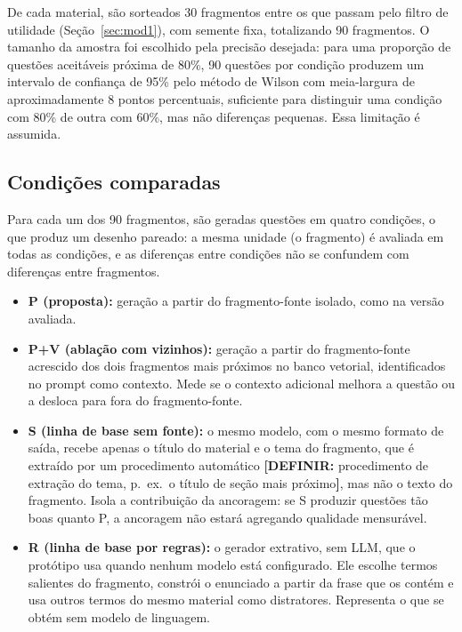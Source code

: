 \documentclass[portuguese,oneside]{tcc}
\newcommand{\definir}[1]{\textcolor{orange!75!black}{\textbf{[DEFINIR:} #1\textbf{]}}}
\begin{document}
De cada material, são sorteados 30 fragmentos entre os que passam pelo filtro de utilidade (Seção~\ref{sec:mod1}), com semente fixa, totalizando 90 fragmentos. O tamanho da amostra foi escolhido pela precisão desejada: para uma proporção de questões aceitáveis próxima de 80\%, 90 questões por condição produzem um intervalo de confiança de 95\% pelo método de Wilson \cite{Wil27} com meia-largura de aproximadamente 8 pontos percentuais, suficiente para distinguir uma condição com 80\% de outra com 60\%, mas não diferenças pequenas. Essa limitação é assumida.

\subsection{Condições comparadas}

Para cada um dos 90 fragmentos, são geradas questões em quatro condições, o que produz um desenho pareado: a mesma unidade (o fragmento) é avaliada em todas as condições, e as diferenças entre condições não se confundem com diferenças entre fragmentos.

\begin{itemize}
  \item \textbf{P (proposta):} geração a partir do fragmento-fonte isolado, como na versão avaliada.
  \item \textbf{P+V (ablação com vizinhos):} geração a partir do fragmento-fonte acrescido dos dois fragmentos mais próximos no banco vetorial, identificados no prompt como contexto. Mede se o contexto adicional melhora a questão ou a desloca para fora do fragmento-fonte.
  \item \textbf{S (linha de base sem fonte):} o mesmo modelo, com o mesmo formato de saída, recebe apenas o título do material e o tema do fragmento, que é extraído por um procedimento automático \definir{procedimento de extração do tema, p.\ ex.\ o título de seção mais próximo}, mas não o texto do fragmento. Isola a contribuição da ancoragem: se S produzir questões tão boas quanto P, a ancoragem não estará agregando qualidade mensurável.
  \item \textbf{R (linha de base por regras):} o gerador extrativo, sem LLM, que o protótipo usa quando nenhum modelo está configurado. Ele escolhe termos salientes do fragmento, constrói o enunciado a partir da frase que os contém e usa outros termos do mesmo material como distratores. Representa o que se obtém sem modelo de linguagem.
\end{itemize}
\end{document}
